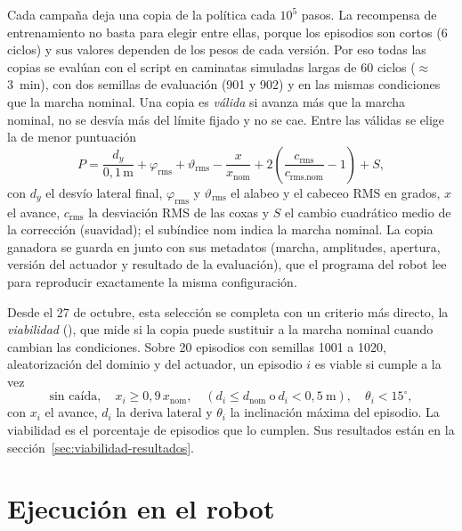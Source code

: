 Cada campaña deja una copia de la política cada $10^5$ pasos. La recompensa de
entrenamiento no basta para elegir entre ellas, porque los episodios son cortos
(6 ciclos) y sus valores dependen de los pesos de cada versión. Por eso todas
las copias se evalúan con el script  en caminatas
simuladas largas de 60 ciclos ($\approx$3~min), con dos semillas de evaluación
(901 y 902) y en las mismas condiciones que la marcha nominal. Una copia es
\emph{válida} si avanza más que la marcha nominal, no se desvía más del límite
fijado y no se cae. Entre las válidas se elige la de menor puntuación
\begin{equation}
    P = \frac{d_y}{0{,}1\,\text{m}} + \varphi_{\text{rms}} + \vartheta_{\text{rms}}
    - \frac{x}{x_{\text{nom}}} + 2\left(\frac{c_{\text{rms}}}{c_{\text{rms,nom}}}-1\right) + S,
    \label{eq:puntuacion-seleccion}
\end{equation}
con $d_y$ el desvío lateral final, $\varphi_{\text{rms}}$ y $\vartheta_{\text{rms}}$
el alabeo y el cabeceo RMS en grados, $x$ el avance, $c_{\text{rms}}$ la
desviación RMS de las coxas y $S$ el cambio cuadrático medio de la corrección
(suavidad); el subíndice nom indica la marcha nominal. La copia ganadora se
guarda en  junto con sus metadatos (marcha, amplitudes,
apertura, versión del actuador y resultado de la evaluación), que el programa
del robot lee para reproducir exactamente la misma configuración.

Desde el 27 de octubre, esta selección se completa con un criterio más directo, la
\emph{viabilidad} (), que mide si la copia puede
sustituir a la marcha nominal cuando cambian las condiciones. Sobre 20 episodios con
semillas 1001 a 1020, aleatorización del dominio y del actuador, un episodio $i$ es
viable si cumple a la vez
\begin{equation}
    \text{sin caída},\quad
    x_i \geq 0{,}9\,x_{\text{nom}},\quad
    \left(d_i \leq d_{\text{nom}} \ \text{o}\ d_i < 0{,}5~\text{m}\right),\quad
    \theta_i < 15^\circ,
    \label{eq:viabilidad}
\end{equation}
con $x_i$ el avance, $d_i$ la deriva lateral y $\theta_i$ la inclinación máxima del
episodio. La viabilidad es el porcentaje de episodios que lo cumplen. Sus resultados
están en la sección~\ref{sec:viabilidad-resultados}.

\section{Ejecución en el robot}


